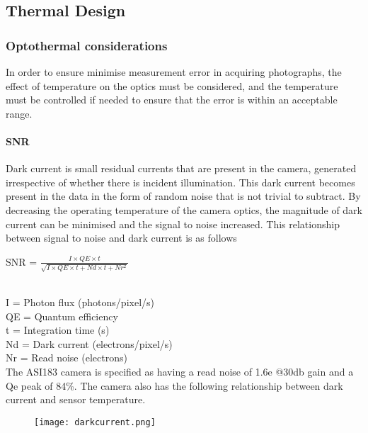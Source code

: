 \pagebreak
\subsection{Thermal Design} \label{Thermal_section}
\subsubsection{Optothermal considerations}

In order to ensure minimise measurement error in acquiring photographs, the effect of temperature on the optics must be considered, and the temperature must be controlled if needed to ensure that the error is within an acceptable range.\

\paragraph{SNR}

Dark current is small residual currents that are present in the camera, generated irrespective of whether there is incident illumination. This dark current becomes present in the data in the form of random noise that is not trivial to subtract. By decreasing the operating temperature of the camera optics, the magnitude of dark current can be minimised and the signal to noise increased. This relationship between signal to noise and dark current is as follows\\

\begin{center}
 SNR =  $\frac{I\times QE\times t}{\sqrt{I\times QE\times t+Nd\times t+Nr^2}}$\\
\end{center}

\\
 
I = Photon flux (photons/pixel/s)\\
QE = Quantum efficiency\\
t = Integration time (s)\\
Nd = Dark current (electrons/pixel/s)\\
Nr = Read noise (electrons)\\

The ASI183 camera is specified as having a read noise of 1.6e @30db gain and a Qe peak of 84\%. The camera also has the following relationship between dark current and sensor temperature. \\


	\begin{figure}[h!]
    \centering
    \texttt{[image: darkcurrent.png]}
	\label{fig: darkcurrent}
	\end{figure}


